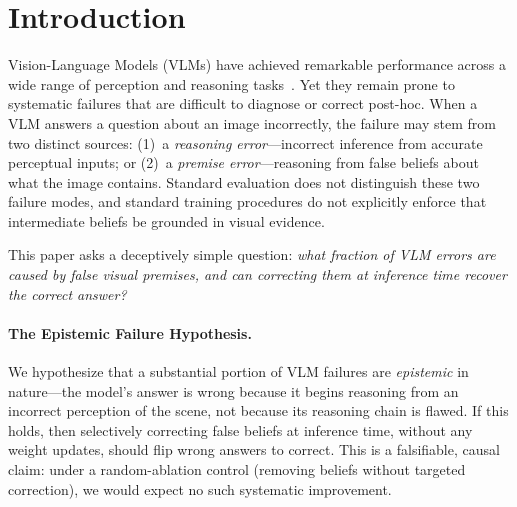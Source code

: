 \section{Introduction}
\label{sec:intro}

Vision-Language Models (VLMs) have achieved remarkable performance across a wide
range of perception and reasoning tasks~\cite{liu2023visual,bai2025qwen,team2023gemini}.
Yet they remain prone to systematic failures that are difficult to diagnose or correct
post-hoc. When a VLM answers a question about an image incorrectly, the failure may
stem from two distinct sources: (1)~a \emph{reasoning error}---incorrect inference
from accurate perceptual inputs; or (2)~a \emph{premise error}---reasoning from false
beliefs about what the image contains. Standard evaluation does not distinguish these
two failure modes, and standard training procedures do not explicitly enforce that
intermediate beliefs be grounded in visual evidence.

This paper asks a deceptively simple question: \emph{what fraction of VLM errors
are caused by false visual premises, and can correcting them at inference time recover
the correct answer?}

\paragraph{The Epistemic Failure Hypothesis.}
We hypothesize that a substantial portion of VLM failures are \emph{epistemic} in
nature---the model's answer is wrong because it begins reasoning from an incorrect
perception of the scene, not because its reasoning chain is flawed.
If this holds, then selectively correcting false beliefs at inference time, without any
weight updates, should flip wrong answers to correct.
This is a falsifiable, causal claim: under a random-ablation control (removing
beliefs without targeted correction), we would expect no such systematic improvement.

